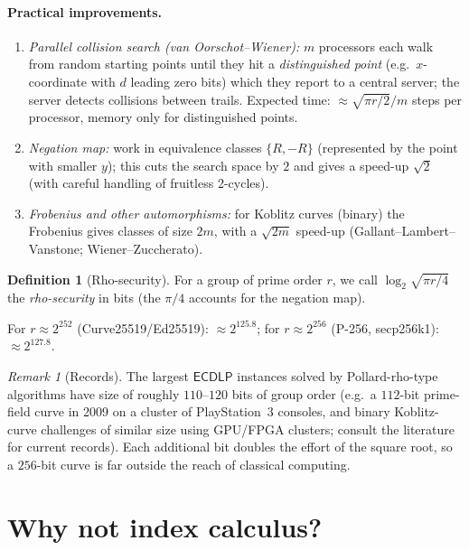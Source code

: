 \documentclass[11pt,a4paper,oneside]{book}
\theoremstyle{plain}
\theoremstyle{definition}
\newtheorem{definition}[theorem]{Definition}
\theoremstyle{remark}
\newtheorem{remark}[theorem]{Remark}
\newcommand{\ECDLP}{\mathsf{ECDLP}}
\begin{document}
\paragraph{Practical improvements.}
\begin{enumerate}[nosep]
\item \emph{Parallel collision search (van Oorschot--Wiener):} $m$ processors each walk from random starting points until they hit a \emph{distinguished point} (e.g.\ $x$-coordinate with $d$ leading zero bits) which they report to a central server; the server detects collisions between trails. Expected time: $\approx\sqrt{\pi r/2}/m$ steps per processor, memory only for distinguished points.
\item \emph{Negation map:} work in equivalence classes $\{R,-R\}$ (represented by the point with smaller $y$); this cuts the search space by $2$ and gives a speed-up $\sqrt2$ (with careful handling of fruitless 2-cycles).
\item \emph{Frobenius and other automorphisms:} for Koblitz curves (binary) the Frobenius gives classes of size $2m$, with a $\sqrt{2m}$ speed-up (Gallant--Lambert--Vanstone; Wiener--Zuccherato).
\end{enumerate}

\begin{definition}[Rho-security]
For a group of prime order $r$, we call $\log_2\sqrt{\pi r/4}$ the \emph{rho-security} in bits (the $\pi/4$ accounts for the negation map).
\end{definition}
For $r\approx2^{252}$ (Curve25519/Ed25519): $\approx2^{125.8}$; for $r\approx2^{256}$ (P-256, secp256k1): $\approx2^{127.8}$.

\begin{remark}[Records]
The largest $\ECDLP$ instances solved by Pollard-rho-type algorithms have size of roughly $110$--$120$ bits of group order (e.g.\ a $112$-bit prime-field curve in 2009 on a cluster of PlayStation~3 consoles, and binary Koblitz-curve challenges of similar size using GPU/FPGA clusters; consult the literature for current records). Each additional bit doubles the effort of the square root, so a $256$-bit curve is far outside the reach of classical computing.
\end{remark}

\section{Why not index calculus?}
\end{document}
